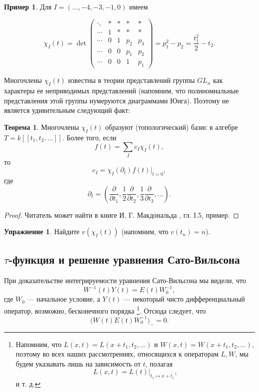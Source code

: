 \documentclass{article}
\theoremstyle{definition}
\newtheorem{theorem}{Теорема}[section]
\theoremstyle{definition} %
\theoremstyle{remark}     %
\theoremstyle{definition}
\theoremstyle{definition}
\theoremstyle{definition}
\theoremstyle{definition}
\theoremstyle{definition}
\theoremstyle{definition}
\newtheorem*{example}{Пример}
\theoremstyle{definition}
\theoremstyle{definition}
\newtheorem{exercise}{Упражнение}[section]
\begin{document}
\begin{example} Для \( I = (\dots, -4, -3, -1, 0) \) имеем

    \[
\chi_I(t) = \det
\begin{pmatrix}
\ddots & * & * & * & * \\
\cdots & 1 & * & * & * \\
\cdots & 0 & 1 & p_2 & p_3 \\
\cdots & 0 & 0 & p_1 & p_2 \\
\cdots & 0 & 0 & 1 & p_1
\end{pmatrix}
= p_1^2 - p_2 = \frac{t_1^2}{2} - t_2.
\]

\end{example}

Многочлены \(\chi_I(t)\) известны в теории представлений группы \(GL_n\) как характеры ее неприводимых представлений (напомним, что полиномиальные представления этой группы нумеруются диаграммами Юнга). Поэтому не является удивительным следующий факт:

\begin{theorem}
  Многочлены \(\chi_I(t)\) образуют (топологический) базис в алгебре \(T = k[[t_1, t_2, \dots]]\). Более того, если
  \[
    f(t) = \sum_I c_I \chi_I(t),
  \]
  то
  \[
    c_I = \chi_I(\partial_t) f(t)\big|_{t=0},
  \]
  где
  \[
    \partial_t = \left( \frac{\partial}{\partial t_1}, \frac{1}{2} \frac{\partial}{\partial t_2}, \frac{1}{3} \frac{\partial}{\partial t_3}, \dots \right).
  \]
\end{theorem}

\begin{proof}
    Читатель может найти в книге И. Г. Макдональда \cite{macdonald}, гл. I.5, пример.
\end{proof}

\begin{exercise}
  Найдите \(v(\chi_I(t))\) (напомним, что \(v(t_n) = n\)).
\end{exercise}





\subsection{$\tau$-функция и решение уравнения Сато-Вильсона}


При доказательстве интегрируемости уравнения Сато-Вильсона мы видели, что  
\[
W^{-1}(t)Y(t) = E(t)W_0^{-1},
\]  
где \(W_0\) — начальное условие, а \(Y(t)\) — некоторый чисто дифференциальный оператор, возможно, бесконечного порядка \footnote{Напомним, что \( L(x, t) = L(x + t_1, t_2, \dots) \) и \( W(x, t) = W(x + t_1, t_2, \dots) \), поэтому во всех наших рассмотрениях, относящихся к операторам \( L, W \), мы будем указывать лишь на зависимость от \( t \), полагая
\[
L(x, t) = L(t)|_{t_1 \mapsto x + t_1},
\]
и т. д.}. Отсюда следует, что  
\[
\bigl(W(t)E(t)W_0^{-1}\bigr)_{-} = 0.
\]  
\end{document}
